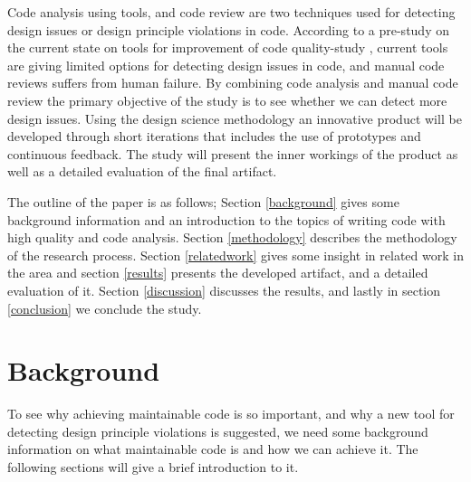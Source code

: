 \documentclass{report}
\begin{document}
Code analysis using tools, and code review are two techniques used for detecting design issues or design principle violations in code. According to a pre-study on the current state on tools for improvement of code quality-study \cite{prestudy}, current tools are giving limited options for detecting design issues in code, and manual code reviews suffers from human failure.   By combining code analysis and manual code review the primary objective of the study is to see whether we can detect more design issues. Using the design science methodology an innovative product will be developed through short iterations that includes the use of prototypes and continuous feedback. The study will present the inner workings of the product as well as a detailed evaluation of the final artifact.






The outline of the paper is as follows; Section \ref{background} gives some background information and an introduction to the topics of writing code with high quality and code analysis. Section \ref{methodology} describes the methodology of the research process. Section \ref{relatedwork} gives some insight in related work in the area and section \ref{results} presents the developed artifact, and a detailed evaluation of it. Section \ref{discussion} discusses the results, and lastly in section \ref{conclusion} we conclude the study.  

\chapter{Background}
\label{background}
To see why achieving maintainable code is so important, and why a new tool for detecting design principle violations is suggested, we need some background information on what maintainable code is and how we can achieve it. The following sections will give a brief introduction to it.
\end{document}
